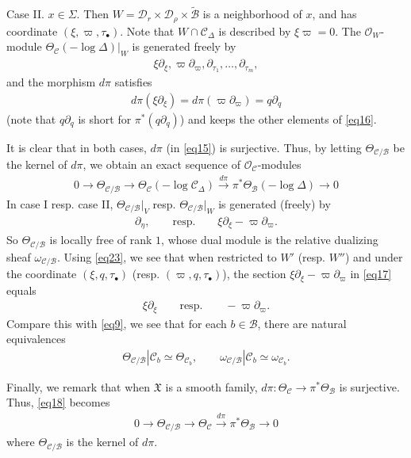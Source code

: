\documentclass[12pt,a4paper,notitlepage]{article}
\theoremstyle{definition}
\theoremstyle{plain}
\newcommand{\fk}{\mathfrak}
\newcommand{\mc}{\mathcal}
\newcommand{\wtd}{\widetilde}
\newcommand{\scr}{\mathscr}
\newcommand{\blt}{\bullet}
\numberwithin{equation}{section}
\begin{document}
Case II. $x\in\Sigma$.  Then $W=\mc D_r\times\mc D_\rho\times\wtd{\mc B}$ is a neighborhood of $x$, and has coordinate $(\xi,\varpi,\tau_\blt)$. Note that $W\cap\mc C_\Delta$ is described by $\xi\varpi=0$. The  $\scr O_W$-module $\Theta_{\mc C}(-\log\Delta)|_W$ is generated freely by
\begin{align}
\xi\partial_\xi,\varpi\partial_\varpi,\partial_{\tau_1},\dots,\partial_{\tau_m},\label{eq16}
\end{align} 
and the morphism $d\pi$ satisfies
\begin{align}
d\pi(\xi\partial_\xi)=d\pi(\varpi\partial_\varpi)=q\partial_q\label{eq81}
\end{align}
(note that $q\partial_q$ is short for $\pi^*(q\partial_q)$) and keeps the other elements of \eqref{eq16}.

It is clear that in both cases, $d\pi$ (in \eqref{eq15}) is surjective. Thus, by letting $\Theta_{\mc C/\mc B}$ \index{zz@$\Theta_{\mc C/\mc B}$} be the kernel of $d\pi$, we obtain an exact sequence of  $\scr O_{\mc C}$-modules
\begin{align}
\boxed{~~0\rightarrow \Theta_{\mc C/\mc B}\rightarrow \Theta_{\mc C}(-\log \mc C_\Delta)\xrightarrow{d\pi}\pi^*\Theta_{\mc B}(-\log \Delta)\rightarrow 0~~}\label{eq18}
\end{align}
In case I resp. case II, $\Theta_{\mc C/\mc B}|_V$ resp. $\Theta_{\mc C/\mc B}|_W$  is generated (freely) by
\begin{align}
\partial_\eta,\qquad\text{resp.}\qquad \xi\partial_\xi-\varpi\partial_\varpi.\label{eq17}
\end{align}
So $\Theta_{\mc C/\mc B}$ is locally free of rank $1$, whose dual module is the relative dualizing sheaf \index{zz@$\omega_{\mc C/\mc B}$} $\omega_{\mc C/\mc B}$. Using \eqref{eq23}, we see that when restricted to $W'$ (resp. $W''$) and under the coordinate $(\xi,q,\tau_\blt)$ (resp. $(\varpi,q,\tau_\blt)$), the section $\xi\partial_\xi-\varpi\partial_\varpi$ in \eqref{eq17} equals
\begin{align}
\xi\partial_\xi\qquad\text{resp.}\qquad -\varpi\partial_\varpi.\label{eq24}
\end{align}
Compare this with \eqref{eq9}, we see that for each $b\in\mc B$, there are natural equivalences
\begin{align*}
\Theta_{\mc C/\mc B}|\mc C_b\simeq\Theta_{\mc C_b},\qquad \omega_{\mc C/\mc B}|\mc C_b\simeq\omega_{\mc C_b}.
\end{align*}

Finally, we remark that when $\fk X$ is a smooth family, $d\pi:\Theta_{\mc C}\rightarrow\pi^*\Theta_{\mc B}$ is surjective. Thus, \eqref{eq18} becomes
\begin{align*}
0\rightarrow \Theta_{\mc C/\mc B}\rightarrow \Theta_{\mc C}\xrightarrow{d\pi}\pi^*\Theta_{\mc B}\rightarrow 0
\end{align*}
where $\Theta_{\mc C/\mc B}$ is the kernel of $d\pi$.
\end{document}
